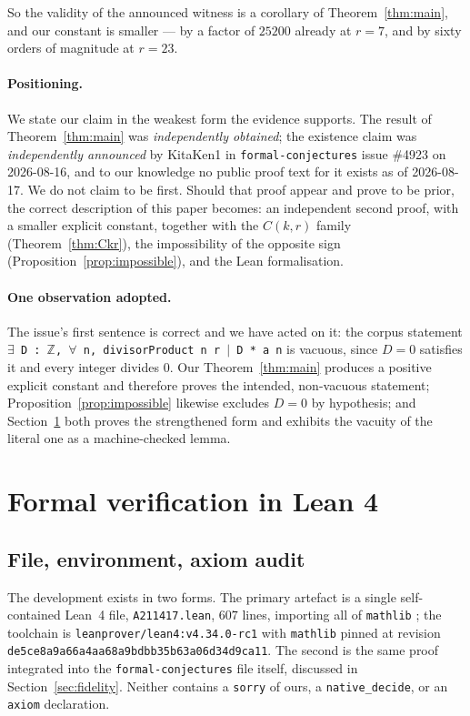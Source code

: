 \documentclass[11pt]{article}
\theoremstyle{plain}
\theoremstyle{definition}
\theoremstyle{remark}
\numberwithin{equation}{section}
\newcommand{\Z}{\mathbb{Z}}
\begin{document}
So the validity of the announced witness is a corollary of Theorem~\ref{thm:main}, and our
constant is smaller --- by a factor of $25200$ already at $r=7$, and by sixty orders of magnitude
at $r=23$.

\paragraph{Positioning.} We state our claim in the weakest form the evidence supports. The result
of Theorem~\ref{thm:main} was \emph{independently obtained}; the existence claim was
\emph{independently announced} by KitaKen1 in \texttt{formal-conjectures} issue \#4923 on
2026-08-16, and to our knowledge no public proof text for it exists as of 2026-08-17. We do not
claim to be first. Should that proof appear and prove to be prior, the correct description of this
paper becomes: an independent second proof, with a smaller explicit constant, together with the
$C(k,r)$ family (Theorem~\ref{thm:Ckr}), the impossibility of the opposite sign
(Proposition~\ref{prop:impossible}), and the Lean formalisation.

\paragraph{One observation adopted.} The issue's first sentence is correct and we have acted on
it: the corpus statement \texttt{$\exists$ D : $\Z$, $\forall$ n, divisorProduct n r $\mid$ D * a n}
is vacuous, since $D = 0$ satisfies it and every integer divides $0$. Our
Theorem~\ref{thm:main} produces a positive explicit constant and therefore proves the intended,
non-vacuous statement; Proposition~\ref{prop:impossible} likewise excludes $D=0$ by hypothesis;
and Section~\ref{sec:formal} both proves the strengthened form and exhibits the vacuity of the
literal one as a machine-checked lemma.

\section{Formal verification in Lean 4}
\label{sec:formal}

\subsection{File, environment, axiom audit}

The development exists in two forms. The primary artefact is a single self-contained Lean~4
\cite{lean4} file, \texttt{A211417.lean}, $607$ lines, importing all of \texttt{mathlib}
\cite{mathlib}; the toolchain is \texttt{leanprover/lean4:v4.34.0-rc1} with \texttt{mathlib}
pinned at revision \texttt{de5ce8a9a66a4aa68a9bdbb35b63a06d34d9ca11}. The second is the same
proof integrated into the \texttt{formal-conjectures} file itself, discussed in
Section~\ref{sec:fidelity}. Neither contains a \texttt{sorry} of ours, a \texttt{native\_decide},
or an \texttt{axiom} declaration.
\end{document}
